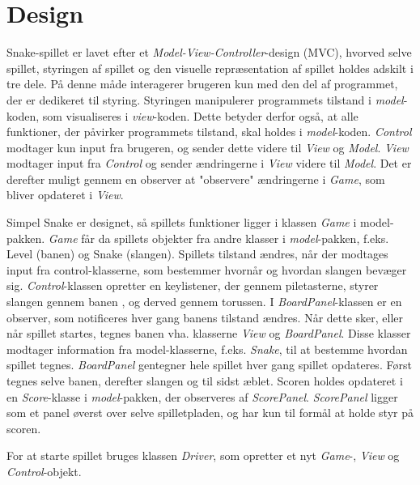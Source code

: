 \section{Design}
Snake-spillet er lavet efter et \textit{Model-View-Controller}-design (MVC), hvorved selve spillet, styringen af spillet og den visuelle repræsentation af spillet holdes adskilt i tre dele. På denne måde interagerer brugeren kun med den del af programmet, der er dedikeret til styring. Styringen manipulerer programmets tilstand i \textit{model}-koden, som visualiseres i \textit{view}-koden. Dette betyder derfor også, at alle funktioner, der påvirker programmets tilstand, skal holdes i \textit{model}-koden. \textit{Control} modtager kun input fra brugeren, og sender dette videre til \textit{View} og \textit{Model}. \textit{View} modtager input fra \textit{Control} og sender ændringerne i \textit{View} videre til \textit{Model}. Det er derefter muligt gennem en observer at "observere" ændringerne i \textit{Game}, som bliver opdateret i \textit{View}.

Simpel Snake er designet, så spillets funktioner ligger i klassen \textit{Game} i model-pakken. \textit{Game} får da spillets objekter fra andre klasser i \textit{model}-pakken, f.eks. Level (banen) og Snake (slangen). Spillets tilstand ændres, når der modtages input fra control-klasserne, som bestemmer hvornår og hvordan slangen bevæger sig. \textit{Control}-klassen opretter en keylistener, der gennem piletasterne, styrer slangen gennem banen , og derved gennem torussen.
I \textit{BoardPanel}-klassen er en observer, som notificeres hver gang banens tilstand ændres. Når dette sker, eller når spillet startes, tegnes banen vha. klasserne \textit{View} og \textit{BoardPanel}. Disse klasser modtager information fra model-klasserne, f.eks. \textit{Snake}, til at bestemme hvordan spillet tegnes. \textit{BoardPanel} gentegner hele spillet hver gang spillet opdateres. Først tegnes selve banen, derefter slangen og til sidst æblet. 
Scoren holdes opdateret i en \textit{Score}-klasse i \textit{model}-pakken, der observeres af \textit{ScorePanel}. \textit{ScorePanel} ligger som et panel øverst over selve spilletpladen, og har kun til formål at holde styr på scoren.

For at starte spillet bruges klassen \textit{Driver}, som opretter et nyt \textit{Game}-, \textit{View} og \textit{Control}-objekt.